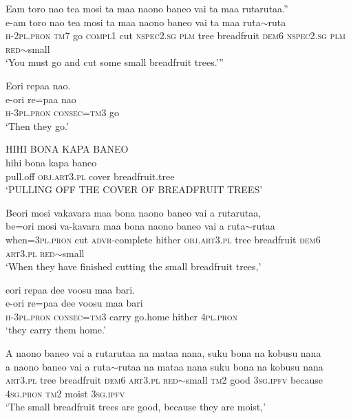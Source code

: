 \ea\label{ex:text4-7}
Eam toro nao tea mosi ta maa naono baneo vai ta maa rutarutaa.''\\
\gll e-am	toro	nao	tea	mosi	ta	maa	naono	baneo	vai	ta	maa	ruta{$\sim$}ruta\\
     \textsc{h}-2\textsc{pl}.\textsc{pron}	\textsc{tm}7	go	\textsc{compl}1	cut	\textsc{nspec}2.\textsc{sg}	\textsc{plm}	tree	breadfruit	\textsc{dem}6	\textsc{nspec}2.\textsc{sg}	\textsc{plm}	\textsc{red}{$\sim$}small\\
\glt `You must go and cut some small breadfruit trees.'''
\z

\ea\label{ex:text4-8}
Eori repaa nao.\\
\gll e-ori	re=paa	nao\\
     \textsc{h}-3\textsc{pl}.\textsc{pron}	\textsc{consec}=\textsc{tm}3	go\\
\glt `Then they go.'
\z

\ea\label{ex:text4-9}
HIHI BONA KAPA BANEO\\
\gll hihi	bona	kapa	baneo\\
     pull.off	\textsc{obj}.\textsc{art}3.\textsc{pl}	cover	breadfruit.tree\\
\glt `PULLING OFF THE COVER OF BREADFRUIT TREES'
\z

\ea\label{ex:text4-10}
Beori mosi vakavara maa bona naono baneo vai a rutarutaa,\\
\gll be=ori	mosi	va-kavara	maa	bona	naono	baneo	vai	a	ruta{$\sim$}rutaa\\
     when=3\textsc{pl}.\textsc{pron}	cut	\textsc{advr}-complete	hither	\textsc{obj}.\textsc{art}3.\textsc{pl}	tree	breadfruit	\textsc{dem}6	\textsc{art}3.\textsc{pl}	\textsc{red}{$\sim$}small\\
\glt `When they have finished cutting the small breadfruit trees,'
\z

\ea\label{ex:text4-11}
eori repaa dee voosu maa bari.\\
\gll e-ori	re=paa	dee	voosu	maa	bari\\
     \textsc{h}-3\textsc{pl}.\textsc{pron}	\textsc{consec}=\textsc{tm}3	carry	go.home	hither	4\textsc{pl}.\textsc{pron}\\
\glt `they carry them home.'
\z

\ea\label{ex:text4-12}
A naono baneo vai a rutarutaa na mataa nana, suku bona na kobusu nana\\
\gll a	naono	baneo	vai	a	ruta{$\sim$}rutaa	na	mataa	nana	suku	bona	na	kobusu	nana\\
     \textsc{art}3.\textsc{pl}	tree	breadfruit	\textsc{dem}6	\textsc{art}3.\textsc{pl}	\textsc{red}{$\sim$}small	\textsc{tm}2	good	3\textsc{sg}.\textsc{ipfv}	because	4\textsc{sg}.\textsc{pron}	\textsc{tm}2	moist	3\textsc{sg}.\textsc{ipfv}\\
\glt `The small breadfruit trees are good, because they are moist,'
\z

